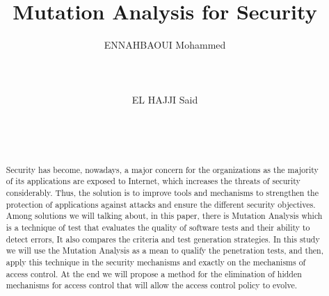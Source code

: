 \documentclass{acm_proc_article-sp}
\begin{document}
\title{Mutation Analysis for Security}





 \author{
\alignauthor ENNAHBAOUI Mohammed\\
       \\
       \\
       \\
\alignauthor EL HAJJI Said\\
       \\
       \\
       \\
}







\maketitle
\begin{abstract}
Security has become, nowadays, a major concern for the organizations as the majority of  its applications are exposed to Internet, which increases the threats of security considerably. Thus, the solution is to improve tools and mechanisms to strengthen the protection of applications against attacks and ensure the different security objectives. Among solutions we will talking about, in this paper, there is Mutation Analysis which is a technique of test  that evaluates the quality of software tests and their ability to detect errors, It also compares the criteria and test generation strategies. In this study we will use the Mutation Analysis as a mean to qualify the penetration tests, and then, apply this technique in the security mechanisms and exactly on the mechanisms of access control. At the end we will propose a method for the elimination of hidden mechanisms for access control that will allow the access control policy to evolve.
\end{abstract}

\end{document}
